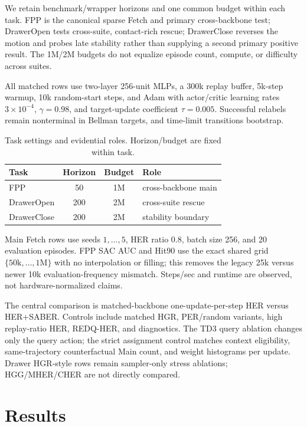 \documentclass[letterpaper]{article}
\begin{document}
We retain benchmark/wrapper horizons and one common budget within each task. FPP is the canonical sparse Fetch and primary cross-backbone test; DrawerOpen tests cross-suite, contact-rich rescue; DrawerClose reverses the motion and probes late stability rather than supplying a second primary positive result. The 1M/2M budgets do not equalize episode count, compute, or difficulty across suites.

All matched rows use two-layer 256-unit MLPs, a 300k replay buffer, 5k-step warmup, 10k random-start steps, and Adam with actor/critic learning rates \(3\times10^{-4}\), \(\gamma=0.98\), and target-update coefficient \(\tau=0.005\). Successful relabels remain nonterminal in Bellman targets, and time-limit transitions bootstrap.

\begin{table}[t]
\centering
\scriptsize
\setlength{\tabcolsep}{3pt}
\caption{Task settings and evidential roles. Horizon/budget are fixed within task.}
\label{tab:design-rationale-submission}
\begin{tabular}{@{}lccp{}@{}}
\toprule
Task & Horizon & Budget & Role \\
\midrule
FPP & 50 & 1M & cross-backbone main \\
DrawerOpen & 200 & 2M & cross-suite rescue \\
DrawerClose & 200 & 2M & stability boundary \\
\bottomrule
\end{tabular}
\end{table}

Main Fetch rows use seeds \(1,\ldots,5\), HER ratio 0.8, batch size 256, and 20 evaluation episodes. FPP SAC AUC and Hit90 use the exact shared grid \(\{50\mathrm{k},\ldots,1\mathrm{M}\}\) with no interpolation or filling; this removes the legacy 25k versus newer 10k evaluation-frequency mismatch. Steps/sec and runtime are observed, not hardware-normalized claims.

The central comparison is matched-backbone one-update-per-step HER versus HER+SABER. Controls include matched HGR, PER/random variants, high replay-ratio HER, REDQ-HER, and diagnostics. The TD3 query ablation changes only the query action; the strict assignment control matches context eligibility, same-trajectory counterfactual Main count, and weight histograms per update. Drawer HGR-style rows remain sampler-only stress ablations; HGG/MHER/CHER are not directly compared.

\section{Results}
\end{document}
